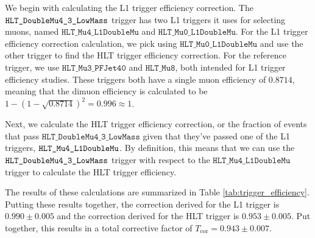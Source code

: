 We begin with calculating the L1 trigger efficiency correction. The $\linebreak[4]\texttt{HLT\_DoubleMu4\_3\_LowMass}$ trigger has two L1 triggers it uses for selecting muons, named $\texttt{HLT\_Mu4\_L1DoubleMu}$ and $\texttt{HLT\_Mu0\_L1DoubleMu}$. For the L1 trigger efficiency correction calculation, we pick using $\texttt{HLT\_Mu0\_L1DoubleMu}$ and use the other trigger to find the HLT trigger efficiency correction. For the reference trigger, we use $\texttt{HLT\_Mu3\_PFJet40}$ and $\texttt{HLT\_Mu8}$, both intended for L1 trigger efficiency studies. These triggers both have a single muon efficiency of $0.8714$, meaning that the dimuon efficiency is calculated to be $1- (1-\sqrt{0.8714})^2 = 0.996 \approx 1$. 

Next, we calculate the HLT trigger efficiency correction, or the fraction of events that pass $\texttt{HLT\_DoubleMu4\_3\_LowMass}$ given that they've passed one of the L1 triggers, $\linebreak[4]\texttt{HLT\_Mu4\_L1DoubleMu}$. By definition, this means that we can use the $\linebreak[4]\texttt{HLT\_DoubleMu4\_3\_LowMass}$ trigger with respect to the  $\texttt{HLT\_Mu4\_L1DoubleMu}$ trigger to calculate the HLT trigger efficiency. 

The results of these calculations are summarized in Table \ref{tab:trigger_efficiency}. Putting these results together, the correction derived for the L1 trigger is $0.990 \pm 0.005$ and the correction derived for the HLT trigger is $0.953 \pm 0.005$. Put together, this results in a total corrective factor of $T_{\text{cor}} = 0.943 \pm 0.007$. 

